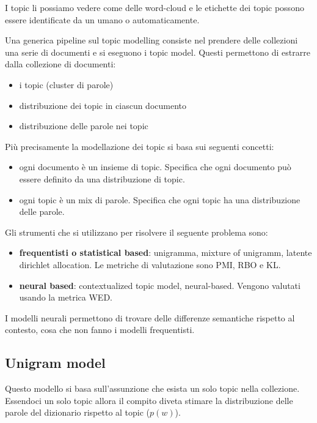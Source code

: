 \begin{nota}
      I topic li possiamo vedere come delle word-cloud e le etichette dei topic
      possono essere identificate da un umano o automaticamente.
\end{nota}

Una generica pipeline sul topic modelling consiste nel prendere delle collezioni
una serie di documenti e si eseguono i topic model.
Questi permettono di estrarre dalla collezione di documenti:
\begin{itemize}
      \item i topic (cluster di parole)
      \item distribuzione dei topic in ciascun documento
      \item distribuzione delle parole nei topic
\end{itemize}

Più precisamente la modellazione dei topic si basa sui seguenti concetti:
\begin{itemize}
      \item ogni documento è un insieme di topic. Specifica che ogni documento
            può essere definito da una distribuzione di topic.
      \item ogni topic è un mix di parole. Specifica che ogni topic ha una distribuzione
            delle parole.
\end{itemize}

Gli strumenti che si utilizzano per risolvere il seguente problema sono:
\begin{itemize}
      \item \textbf{frequentisti o statistical based}: unigramma, mixture of unigramm, latente dirichlet allocation.
            Le metriche di valutazione sono PMI, RBO e KL.
      \item \textbf{neural based}: contextualized topic model, neural-based. Vengono
            valutati usando la metrica WED.
\end{itemize}

I modelli neurali permettono di trovare delle differenze semantiche rispetto al
contesto, cosa che non fanno i modelli frequentisti.

\subsection{Unigram model}
Questo modello si basa sull'assunzione che esista un solo topic nella collezione.
Essendoci un solo topic allora il compito diveta stimare la distribuzione delle
parole del dizionario rispetto al topic ($p(w)$).

